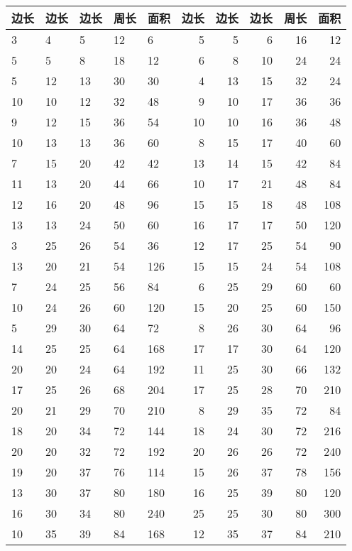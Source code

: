 \documentclass[12pt]{article}
\begin{document}
\begin{table}[H]
\centering
{}
\begin{tabular}{lllllrrrrr}
\toprule
边长&边长&边长&周长&面积 &       边长&边长&边长&周长&面积\\
\midrule
3  & 4  & 5  & 12 & 6   &	5  & 5  & 6  & 16 & 12 \\
5  & 5  & 8  & 18 & 12  &	6  & 8  & 10 & 24 & 24 \\
5  & 12 & 13 & 30 & 30  &	4  & 13 & 15 & 32 & 24 \\
10 & 10 & 12 & 32 & 48  &	9  & 10 & 17 & 36 & 36 \\
9  & 12 & 15 & 36 & 54  &	10 & 10 & 16 & 36 & 48 \\
10 & 13 & 13 & 36 & 60  &	8  & 15 & 17 & 40 & 60 \\
7  & 15 & 20 & 42 & 42  &	13 & 14 & 15 & 42 & 84 \\
11 & 13 & 20 & 44 & 66  &	10 & 17 & 21 & 48 & 84 \\
12 & 16 & 20 & 48 & 96  &	15 & 15 & 18 & 48 & 108\\
13 & 13 & 24 & 50 & 60  &	16 & 17 & 17 & 50 & 120\\
3  & 25 & 26 & 54 & 36  &	12 & 17 & 25 & 54 & 90 \\
13 & 20 & 21 & 54 & 126 &	15 & 15 & 24 & 54 & 108\\
7  & 24 & 25 & 56 & 84  &	6  & 25 & 29 & 60 & 60 \\
10 & 24 & 26 & 60 & 120 &	15 & 20 & 25 & 60 & 150\\
5  & 29 & 30 & 64 & 72  &	8  & 26 & 30 & 64 & 96 \\
14 & 25 & 25 & 64 & 168 &	17 & 17 & 30 & 64 & 120\\
20 & 20 & 24 & 64 & 192 &	11 & 25 & 30 & 66 & 132\\
17 & 25 & 26 & 68 & 204 &	17 & 25 & 28 & 70 & 210\\
20 & 21 & 29 & 70 & 210 &	8  & 29 & 35 & 72 & 84 \\
18 & 20 & 34 & 72 & 144 &	18 & 24 & 30 & 72 & 216\\
20 & 20 & 32 & 72 & 192 &	20 & 26 & 26 & 72 & 240\\
19 & 20 & 37 & 76 & 114 &	15 & 26 & 37 & 78 & 156\\
13 & 30 & 37 & 80 & 180 &	16 & 25 & 39 & 80 & 120\\
16 & 30 & 34 & 80 & 240 &	25 & 25 & 30 & 80 & 300\\
10 & 35 & 39 & 84 & 168 &	12 & 35 & 37 & 84 & 210\\

\end{tabular}
\end{table}
\end{document}
